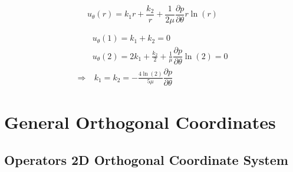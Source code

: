 \documentclass{article}
\numberwithin{equation}{section}
\newcommand{\pd}[2]{\dfrac{\partial #1}{\partial #2}}
\begin{document}
\begin{equation}
    u_\theta(r) = k_1r + \frac{k_2}{r} + \frac{1}{2\mu} \pd{p}{\theta} r \ln(r)
\end{equation}

\begin{equation}
    \begin{split}
        &u_\theta(1) = k_1 + k_2 = 0 \\
        &u_\theta(2) = 2k_1 + \frac{k_2}{2} + \frac{1}{\mu} \pd{p}{\theta} \ln(2) = 0 \\
        \Rightarrow &\ k_1 = k_2 = -\frac{4 \ln(2)}{5\mu} \pd{p}{\theta}
    \end{split}
\end{equation}

\section{General Orthogonal Coordinates}

\subsection{Operators 2D Orthogonal Coordinate System}
\end{document}
